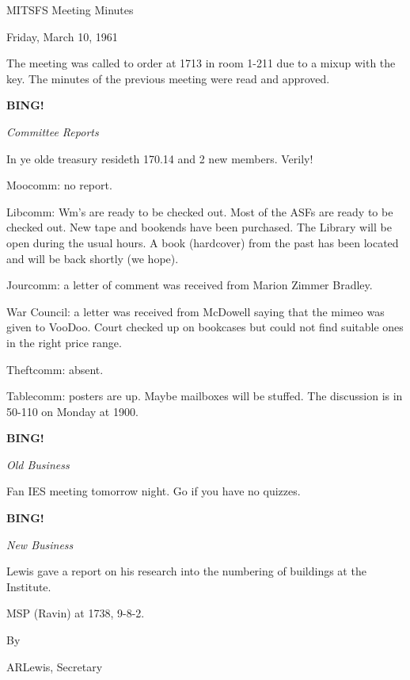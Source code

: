 \documentclass[12pt]{article}
\newcommand{\bing}{{\bf BING!} }
\newcommand{\goto}[1]{\bing \vskip 12pt \centerline{{\em{#1}}}}
\begin{document}
\begin{center}

MITSFS Meeting Minutes

Friday, March 10, 1961

\end{center}
 
\vspace{12pt}

\setlength{\parskip}{6pt}

\noindent
The meeting was called to order at 1713 in room 1-211 due to a mixup with the key. The minutes of the previous meeting were read and approved.

\goto{Committee Reports}

In ye olde treasury resideth 170.14 and 2 new members. Verily!

Moocomm: no report.

Libcomm: Wm's are ready to be checked out. Most of the ASFs are ready to be checked out. New tape and bookends have been purchased. The Library will be open during the usual hours. A book (hardcover) from the past has been located and will be back shortly (we hope).

Jourcomm: a letter of comment was received from Marion Zimmer Bradley.

War Council: a letter was received from McDowell saying that the mimeo was given to VooDoo. Court checked up on bookcases but could not find suitable ones in the right price range.

Theftcomm: absent.

Tablecomm: posters are up. Maybe mailboxes will be stuffed. The discussion is in 50-110 on Monday at 1900.

\goto{Old Business}

Fan IES meeting tomorrow night. Go if you have no quizzes.

\goto{New Business}

Lewis gave a report on his research into the numbering of buildings at the Institute.

MSP (Ravin) at 1738, 9-8-2.

\vspace{12pt}

\centerline{By}
\centerline{ARLewis, Secretary}
\end{document}
